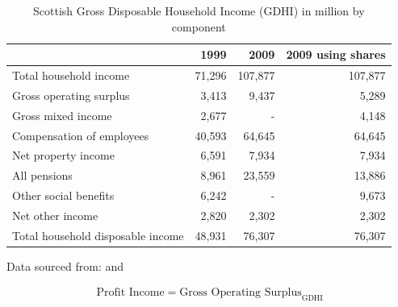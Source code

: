 \begin{enumerate}
\bigskip

\begin{table}[H] \caption{Scottish Gross Disposable Household Income (GDHI) in \textsterling million by component}
\bigskip \begin{scriptsize} \begin{centering} \begin{doublespacing}
    \begin{tabular}{lrrr}
        \toprule
          & 1999  & 2009  & 2009 using shares \\
        \hline      
    Total household income &              71,296  &               107,877  &               107,877  \\
    Gross operating surplus &                 3,413  &                   9,437  &                   5,289  \\
    Gross mixed income &                 2,677  &   -    &                   4,148  \\
    Compensation of employees &              40,593  &                 64,645  &                 64,645  \\
    Net property income &                 6,591  &                   7,934  &                   7,934  \\
    All pensions &                 8,961  &                 23,559  &                 13,886  \\
    Other social benefits &                 6,242  &   -    &                   9,673  \\
    Net other income &                 2,820  &                   2,302  &                   2,302  \\
    \hline
    Total household disposable income &              48,931  &                 76,307  &                 76,307  \\
\bottomrule \end{tabular}%
\bigskip \begin{flushright} Data sourced from: \cite{ONS2013a} and \end{flushright} \label{tab:2.4.2} 
\end{doublespacing} \end{centering} \end{scriptsize} \end{table} \bigskip



\begin{equation}
\begin{split}
\text{Profit Income} = \text{Gross Operating Surplus}_\text{GDHI}
\end{split} \label{eq:2.5.3}
\end{equation}


\end{enumerate}
